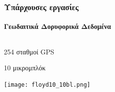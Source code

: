 \begin{frame}
  \frametitle{Υπάρχουσες εργασίες}
  \framesubtitle{Γεωδαιτικά Δορυφορικά Δεδομένα}
  \label{fr2:satgeod3}
\begin{columns}
  \begin{column}{.48\textwidth}
    \begin{block}{\textcite{Taymaz1991,Floyd2010}}
    254 σταθμοί GPS\par
    10 μικρομπλόκ
    \end{block}
    \centering  
    \texttt{[image: floyd10\_10bl.png]}
  \end{column}
\end{columns}
\end{frame}
\note{}



